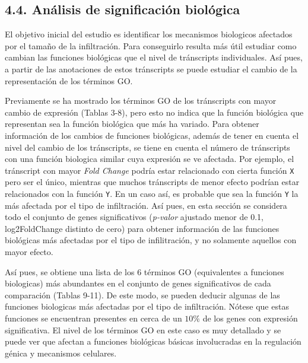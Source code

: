 \documentclass[
]{article}
\begin{document}
\hypertarget{anuxe1lisis-de-significaciuxf3n-bioluxf3gica-1}{%
\subsection{4.4. Análisis de significación
biológica}\label{anuxe1lisis-de-significaciuxf3n-bioluxf3gica-1}}

El objetivo inicial del estudio es identificar los mecanismos biologicos
afectados por el tamaño de la infiltración. Para conseguirlo resulta más
útil estudiar como cambian las funciones biológicas que el nivel de
tránscripts individuales. Así pues, a partir de las anotaciones de estos
tránscripts se puede estudiar el cambio de la representación de los
términos GO.

Previamente se ha mostrado los términos GO de los tránscripts con mayor
cambio de expresión (Tablas 3-8), pero esto no indica que la función
biológica que representan sea la función biológica que más ha variado.
Para obtener información de los cambios de funciones biológicas, además
de tener en cuenta el nivel del cambio de los tránscripts, se tiene en
cuenta el número de tránscripts con una función biologica similar cuya
expresión se ve afectada. Por ejemplo, el tránscript con mayor
\emph{Fold Change} podría estar relacionado con cierta función
\texttt{X} pero ser el único, mientras que muchos tránscripts de menor
efecto podrían estar relacionados con la función \texttt{Y}. En un caso
así, es probable que sea la función \texttt{Y} la más afectada por el
tipo de infiltración. Así pues, en esta sección se considera todo el
conjunto de genes significativos (\emph{p-valor} ajustado menor de 0.1,
log2FoldChange distinto de cero) para obtener información de las
funciones biológicas más afectadas por el tipo de infilitración, y no
solamente aquellos con mayor efecto.

Así pues, se obtiene una lista de los 6 términos GO (equivalentes a
funciones biologicas) más abundantes en el conjunto de genes
significativos de cada comparación (Tablas 9-11). De este modo, se
pueden deducir algunas de las funciones biologicas más afectadas por el
tipo de infiltración. Nótese que estas funciones se encuentran presentes
en cerca de un \(10\%\) de los genes con expresión significativa. El
nivel de los términos GO en este caso es muy detallado y se puede ver
que afectan a funciones biológicas básicas involucradas en la regulación
génica y mecanismos celulares.
\end{document}
